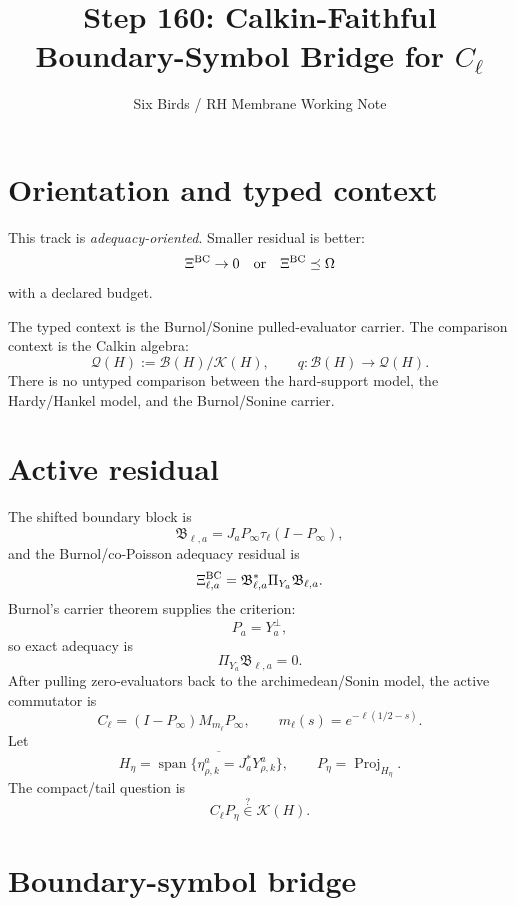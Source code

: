 \documentclass[11pt]{article}
\title{Step 160: Calkin-Faithful Boundary-Symbol Bridge for \(C_\ell\)}
\author{Six Birds / RH Membrane Working Note}
\date{}
\begin{document}
\maketitle

\section{Orientation and typed context}

This track is \emph{adequacy-oriented}.  Smaller residual is better:
\[
\Xi^{\rm BC}\to 0
\quad\text{or}\quad
\Xi^{\rm BC}\preceq \Omega
\]
with a declared budget.

The typed context is the Burnol/Sonine pulled-evaluator carrier.  The comparison
context is the Calkin algebra:
\[
\mathcal Q(H):=\mathcal B(H)/\mathcal K(H),
\qquad q:\mathcal B(H)\to \mathcal Q(H).
\]
There is no untyped comparison between the hard-support model, the Hardy/Hankel
model, and the Burnol/Sonine carrier.

\section{Active residual}

The shifted boundary block is
\[
\mathfrak B_{\ell,a}=J_aP_\infty\tau_\ell(I-P_\infty),
\]
and the Burnol/co-Poisson adequacy residual is
\[
\Xi^{\rm BC}_{\ell,a}
=
\mathfrak B_{\ell,a}^{*}\Pi_{Y_a}\mathfrak B_{\ell,a}.
\]
Burnol's carrier theorem supplies the criterion:
\[
P_a=Y_a^\perp,
\]
so exact adequacy is
\[
\Pi_{Y_a}\mathfrak B_{\ell,a}=0.
\]
After pulling zero-evaluators back to the archimedean/Sonin model, the active
commutator is
\[
C_\ell=(I-P_\infty)M_{m_\ell}P_\infty,
\qquad
m_\ell(s)=e^{-\ell(1/2-s)}.
\]
Let
\[
H_\eta=\overline{\operatorname{span}\{\eta^a_{\rho,k}=J_a^*Y^a_{\rho,k}\}},
\qquad
P_\eta=\operatorname{Proj}_{H_\eta}.
\]
The compact/tail question is
\[
C_\ell P_\eta\stackrel{?}{\in}\mathcal K(H).
\]

\section{Boundary-symbol bridge}
\end{document}
